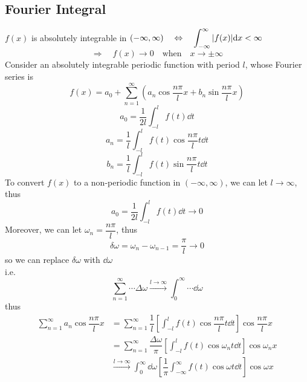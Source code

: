 \documentclass[UTF8]{ctexart} %
\newcommand{\dis}{\displaystyle}
\numberwithin{equation}{section}
\begin{document}
\subsection{Fourier Integral}
$f(x)$ is absolutely integrable in $(-\infty,\infty) \quad \Leftrightarrow  \quad \dis\int_{-\infty}^\infty \abs{f(x)}\dd x < \infty$\\
$$\Rightarrow \quad f(x)\rightarrow 0 \quad\text{when}\quad x\rightarrow\pm\infty$$
Consider an absolutely integrable periodic function with period $l$, whose Fourier series is
\begin{equation}\label{FS}
f(x)=a_0+\sum_{n=1}^\infty(a_n\cos \dfrac{n\pi}{l}x+b_n\sin \dfrac{n\pi}{l}x)
\end{equation}
\begin{equation}\label{key}
a_0=\dfrac{1}{2l}\int_{-l}^{l}f(t)\dd{t}
\end{equation}
\begin{equation}\label{key}
a_n=\dfrac{1}{l}\int_{-l}^{l}f(t)\cos\dfrac{n\pi}{l}t\dd t
\end{equation}
\begin{equation}\label{key}
b_n=\dfrac{1}{l}\int_{-l}^{l}f(t)\sin\dfrac{n\pi}{l}t\dd t
\end{equation}
To convert $f(x)$ to a non-periodic function in $(-\infty,\infty)$, we can let $l\rightarrow\infty$, thus
\begin{equation}\label{key}
a_0=\dfrac{1}{2l}\int_{-l}^{l}f(t)\dd{t}\rightarrow 0
\end{equation}
Moreover, we can let $\omega_n=\dfrac{n\pi}{l}$, thus
\begin{equation}\label{key}
\delta\omega=\omega_n - \omega_{n-1}=\dfrac{\pi}{l}\rightarrow 0
\end{equation}
so we can replace $\delta\omega$ with $\dd \omega$\\
i.e.
\begin{equation}\label{key}
\sum_{n=1}^\infty\cdots\Delta\omega\xrightarrow{l\rightarrow\infty}\int_0^\infty\cdots\dd \omega
\end{equation}
thus
\begin{equation}\label{key}
\begin{aligned}
\sum_{n=1}^\infty a_n\cos \dfrac{n\pi}{l}x &=\sum_{n=1}^\infty \dfrac{1}{l}\left[\int_{-l}^l f(t)\cos\dfrac{n\pi}{l}t\dd t\right]\cos\dfrac{n\pi}{l}x\\
&=\sum_{n=1}^\infty \dfrac{\Delta\omega}{\pi}\left[\int_{-l}^l f(t)\cos\omega_n t\dd t\right]\cos\omega_n x\\
&\xrightarrow{l\rightarrow\infty}\int_0^\infty \dd \omega \left[\dfrac{1}{\pi}\int_{-\infty}^\infty f(t)\cos\omega t \dd t\right]\cos\omega x
\end{aligned}
\end{equation}
\end{document}

